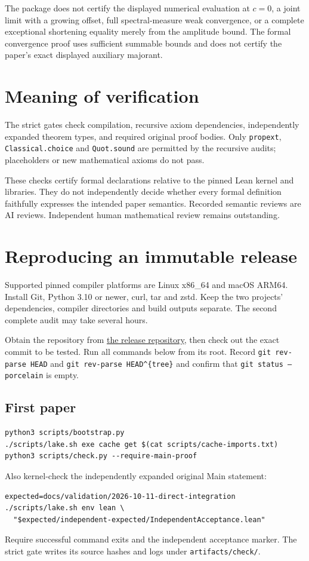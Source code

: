\documentclass[10pt]{amsart}
\begin{document}
The package does not certify the displayed numerical evaluation at $c=0$,
a joint limit with a growing offset, full spectral-measure weak
convergence, or a complete exceptional shortening equality merely from
the amplitude bound. The formal convergence proof uses sufficient summable
bounds and does not certify the paper's exact displayed auxiliary majorant.

\section{Meaning of verification}
The strict gates check compilation, recursive axiom dependencies,
independently expanded theorem types, and required original proof bodies.
Only \texttt{propext}, \texttt{Classical.choice} and \texttt{Quot.sound}
are permitted by the recursive audits; placeholders or new mathematical
axioms do not pass.

These checks certify formal declarations relative to the pinned Lean kernel
and libraries. They do not independently decide whether every formal
definition faithfully expresses the intended paper semantics.
Recorded semantic reviews are AI reviews.
Independent human mathematical review remains outstanding.
\newpage

\section{Reproducing an immutable release}
Supported pinned compiler platforms are Linux x86\_64 and macOS ARM64.
Install Git, Python 3.10 or newer, curl, tar and zstd.
Keep the two projects' dependencies, compiler directories and build outputs
separate. The second complete audit may take several hours.

Obtain the repository from
\href{https://github.com/Imine20/Lean-formalization-for-stabilizer-state-identification}
{the release repository}, then check out the exact commit to be tested.
Run all commands below from its root.
Record \texttt{git rev-parse HEAD} and \texttt{git rev-parse HEAD\^{}\{tree\}}
and confirm that \texttt{git status --porcelain} is empty.

\subsection*{First paper}
\begin{verbatim}
python3 scripts/bootstrap.py
./scripts/lake.sh exe cache get $(cat scripts/cache-imports.txt)
python3 scripts/check.py --require-main-proof
\end{verbatim}
Also kernel-check the independently expanded original Main statement:
\begin{verbatim}
expected=docs/validation/2026-10-11-direct-integration
./scripts/lake.sh env lean \
  "$expected/independent-expected/IndependentAcceptance.lean"
\end{verbatim}
Require successful command exits and the independent acceptance marker.
The strict gate writes its source hashes and logs under
\texttt{artifacts/check/}.
\end{document}
